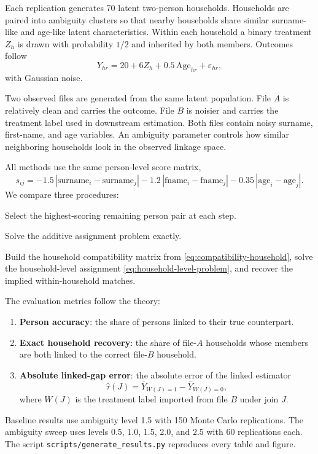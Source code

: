 \documentclass[11pt]{article}
\theoremstyle{remark}
\begin{document}
Each replication generates 70 latent two-person households. Households are paired into ambiguity clusters so that nearby households share similar surname-like and age-like latent characteristics. Within each household a binary treatment $Z_h$ is drawn with probability $1/2$ and inherited by both members. Outcomes follow
\[
Y_{hr}=20+6Z_h+0.5\,\mathrm{Age}_{hr}+\varepsilon_{hr},
\]
with Gaussian noise.

Two observed files are generated from the same latent population. File $A$ is relatively clean and carries the outcome. File $B$ is noisier and carries the treatment label used in downstream estimation. Both files contain noisy surname, first-name, and age variables. An ambiguity parameter controls how similar neighboring households look in the observed linkage space.

All methods use the same person-level score matrix,
\[
s_{ij}=-1.5\,|\text{surname}_i-\text{surname}_j|-1.2\,|\text{fname}_i-\text{fname}_j|-0.35\,|\text{age}_i-\text{age}_j|.
\]
We compare three procedures:
\begin{description}[leftmargin=1.5em]
    \item[Greedy person-level.] Select the highest-scoring remaining person pair at each step.
    \item[Hungarian person-level.] Solve the additive assignment problem exactly.
    \item[Structured exact optimizer.] Build the household compatibility matrix from \eqref{eq:compatibility-household}, solve the household-level assignment \eqref{eq:household-level-problem}, and recover the implied within-household matches.
\end{description}

The evaluation metrics follow the theory:
\begin{enumerate}[leftmargin=1.5em]
    \item \textbf{Person accuracy}: the share of persons linked to their true counterpart.
    \item \textbf{Exact household recovery}: the share of file-$A$ households whose members are both linked to the correct file-$B$ household.
    \item \textbf{Absolute linked-gap error}: the absolute error of the linked estimator
    \[
    \hat\tau(J)=\bar Y_{W(J)=1}-\bar Y_{W(J)=0},
    \]
    where $W(J)$ is the treatment label imported from file $B$ under join $J$.
\end{enumerate}

Baseline results use ambiguity level 1.5 with 150 Monte Carlo replications. The ambiguity sweep uses levels 0.5, 1.0, 1.5, 2.0, and 2.5 with 60 replications each. The script \texttt{scripts/generate\_results.py} reproduces every table and figure.
\end{document}
